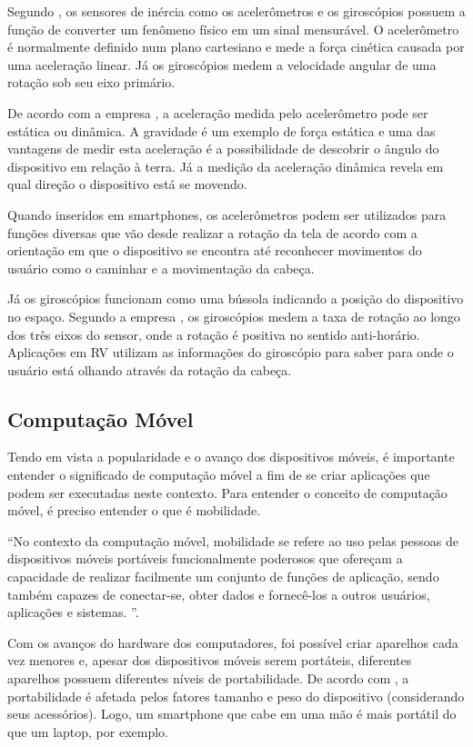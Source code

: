 Segundo , os sensores de inércia como os acelerômetros e os giroscópios possuem a função de converter um fenômeno físico em um sinal mensurável. O acelerômetro é normalmente definido num plano cartesiano e mede a força cinética causada por uma aceleração linear. Já os giroscópios medem a velocidade angular de uma rotação sob seu eixo primário.

De acordo com a empresa , a aceleração medida pelo acelerômetro pode ser estática ou dinâmica. A gravidade é um exemplo de força estática e uma das vantagens de medir esta aceleração é a possibilidade de descobrir o ângulo do dispositivo em relação à terra. Já a medição da aceleração dinâmica revela em qual direção o dispositivo está se movendo. 

Quando inseridos em smartphones, os acelerômetros podem ser utilizados para funções diversas que vão desde realizar a rotação da tela de acordo com a orientação em que o dispositivo se encontra até reconhecer movimentos do usuário como o caminhar e a movimentação da cabeça. 

Já os giroscópios funcionam como uma bússola indicando a posição do dispositivo no espaço. Segundo a empresa , os giroscópios medem a taxa de rotação ao longo dos três eixos do sensor, onde a rotação é positiva no sentido anti-horário. Aplicações em RV utilizam as informações do giroscópio para saber para onde o usuário está olhando através da rotação da cabeça.

\subsection{Computação Móvel}
\label{ss.computacaomovel}

Tendo em vista a popularidade e o avanço dos dispositivos móveis, é importante entender o significado de computação móvel a fim de se criar aplicações que podem ser executadas neste contexto. Para entender o conceito de computação móvel, é preciso entender o que é mobilidade.

“No contexto da computação móvel, mobilidade se refere ao uso pelas pessoas de dispositivos móveis portáveis funcionalmente poderosos que ofereçam a capacidade de realizar facilmente um conjunto de funções de aplicação, sendo também capazes de conectar-se, obter dados e fornecê-los a outros usuários, aplicações e sistemas. ”. \cite[p. ~1]{lee}

Com os avanços do hardware dos computadores, foi possível criar aparelhos cada vez menores e, apesar dos dispositivos móveis serem portáteis, diferentes aparelhos possuem diferentes níveis de portabilidade. De acordo com , a portabilidade é afetada pelos fatores tamanho e peso do dispositivo (considerando seus acessórios). Logo, um smartphone que cabe em uma mão é mais portátil do que um laptop, por exemplo. 

